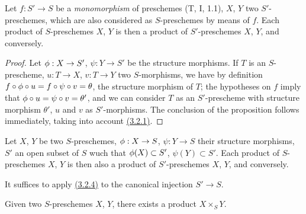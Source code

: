 \begin{prop}[3.2.4]
\label{prop-1.3.2.4}
Let $f:S'\to S$ be a {\it monomorphism} of preschemes {\rm (T, I, 1.1)}, $X$, $Y$ two
$S'$-preschemes, which are also considered as $S$-preschemes by means of $f$. Each product of
$S$-preschemes $X$, $Y$ is then a product of $S'$-preschemes $X$, $Y$, and conversely.
\end{prop}

\begin{proof}
\label{proof-prop-1.3.2.4}
Let $\phi:X\to S'$, $\psi:Y\to S'$ be the structure morphisms. If $T$ is an $S$-prescheme,
$u:T\to X$, $v:T\to Y$ two $S$-morphisms, we have by definition
$f\circ\phi\circ u=f\circ\psi\circ v=\theta$, the structure morphism of $T$; the hypotheses
on $f$ imply that $\phi\circ u=\psi\circ v=\theta'$, and we can consider $T$ as an
$S'$-prescheme with structure morphism $\theta'$, $u$ and $v$ as $S'$-morphisms. The
conclusion of the proposition follows immediately, taking into account \hyperref[defn-1.3.2.1]{(3.2.1)}.
\end{proof}

\begin{cor}[3.2.5]
\label{cor-1.3.2.5}
Let $X$, $Y$ be two $S$-preschemes, $\phi:X\to S$, $\psi:Y\to S$ their structure morphisms,
$S'$ an open subset of $S$ wuch that $\phi(X)\subset S'$, $\psi(Y)\subset S'$. Each product
of $S$-preschemes $X$, $Y$ is then also a product of $S'$-preschemes $X$, $Y$, and
conversely.
\end{cor}

It suffices to apply \hyperref[prop-1.3.2.4]{(3.2.4)} to the canonical injection $S'\to S$.

\begin{thm}[3.2.6]
\label{thm-1.3.2.6}
Given two $S$-preschemes $X$, $Y$, there exists a product $X\times_S Y$.
\end{thm}

